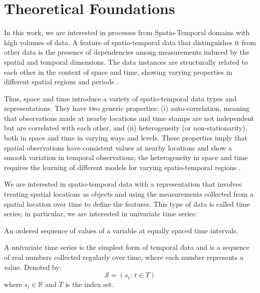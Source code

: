 \chapter{Theoretical Foundations}
\label{chapter_Theoretical_Foundations}

In this work, we are interested in processes from Spatio-Temporal domains with high volumes of data. A feature of spatio-temporal data that distinguishes it from other data is the presence of dependencies among measurements induced by the spatial and temporal dimensions. The data instances are structurally related to each other in the context of space and time, showing varying properties in different spatial regions and periods \cite{Atluri2018}. 

Thus, space and time introduce a variety of spatio-temporal data types and representations. They have two generic properties: (i) auto-correlation, meaning that observations made at nearby locations and time stamps are not independent but are correlated with each other, and (ii) heterogeneity (or non-stationarity), both in space and time in varying ways and levels. These properties imply that spatial observations have consistent values at nearby locations and show a smooth variation in temporal observations; the heterogeneity in space and time requires the learning of different models for varying spatio-temporal regions \cite{Wikle2019}.

We are interested in spatio-temporal data with a representation that involves treating spatial locations as objects and using the measurements collected from a spatial location over time to define the features. This type of data is called time series; in particular, we are interested in univariate time series:

\begin{definition}
	An ordered sequence of values of a variable at equally spaced time intervals.
\end{definition}

\begin{definition}
	A univariate time series is the simplest form of temporal data and is a sequence of real numbers collected regularly over time, where each number represents a value. Denoted by:
	\begin{equation}
	    \mathcal{S} = \left(s_{t}: \, t \in T \right)
	\end{equation}
	where $s_{t} \in \mathbb{R}$ and $T$ is the index set.
\end{definition}

